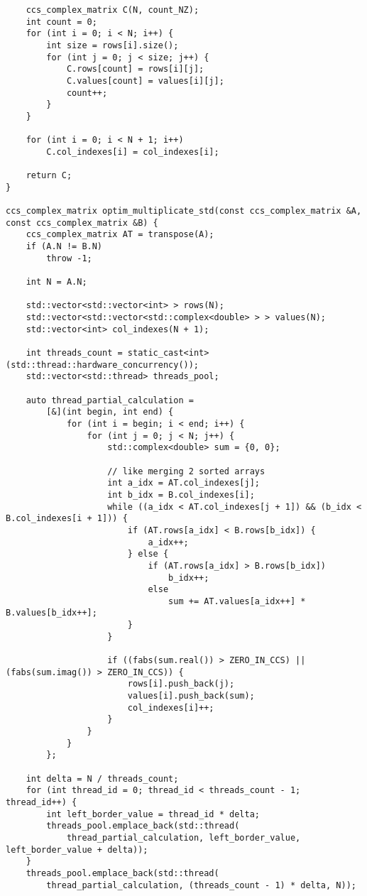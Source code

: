 \documentclass{report}
\begin{document}
\begin{itemize}
\begin{itemize}
\begin{lstlisting}
    ccs_complex_matrix C(N, count_NZ);
    int count = 0;
    for (int i = 0; i < N; i++) {
        int size = rows[i].size();
        for (int j = 0; j < size; j++) {
            C.rows[count] = rows[i][j];
            C.values[count] = values[i][j];
            count++;
        }
    }

    for (int i = 0; i < N + 1; i++)
        C.col_indexes[i] = col_indexes[i];

    return C;
}

ccs_complex_matrix optim_multiplicate_std(const ccs_complex_matrix &A, const ccs_complex_matrix &B) {
    ccs_complex_matrix AT = transpose(A);
    if (A.N != B.N)
        throw -1;

    int N = A.N;

    std::vector<std::vector<int> > rows(N);
    std::vector<std::vector<std::complex<double> > > values(N);
    std::vector<int> col_indexes(N + 1);

    int threads_count = static_cast<int>(std::thread::hardware_concurrency());
    std::vector<std::thread> threads_pool;

    auto thread_partial_calculation =
        [&](int begin, int end) {
            for (int i = begin; i < end; i++) {
                for (int j = 0; j < N; j++) {
                    std::complex<double> sum = {0, 0};

                    // like merging 2 sorted arrays
                    int a_idx = AT.col_indexes[j];
                    int b_idx = B.col_indexes[i];
                    while ((a_idx < AT.col_indexes[j + 1]) && (b_idx < B.col_indexes[i + 1])) {
                        if (AT.rows[a_idx] < B.rows[b_idx]) {
                            a_idx++;
                        } else {
                            if (AT.rows[a_idx] > B.rows[b_idx])
                                b_idx++;
                            else
                                sum += AT.values[a_idx++] * B.values[b_idx++];
                        }
                    }

                    if ((fabs(sum.real()) > ZERO_IN_CCS) || (fabs(sum.imag()) > ZERO_IN_CCS)) {
                        rows[i].push_back(j);
                        values[i].push_back(sum);
                        col_indexes[i]++;
                    }
                }
            }
        };

    int delta = N / threads_count;
    for (int thread_id = 0; thread_id < threads_count - 1; thread_id++) {
        int left_border_value = thread_id * delta;
        threads_pool.emplace_back(std::thread(
            thread_partial_calculation, left_border_value, left_border_value + delta));
    }
    threads_pool.emplace_back(std::thread(
        thread_partial_calculation, (threads_count - 1) * delta, N));


\end{lstlisting}
\end{itemize}
\end{itemize}
\end{document}
